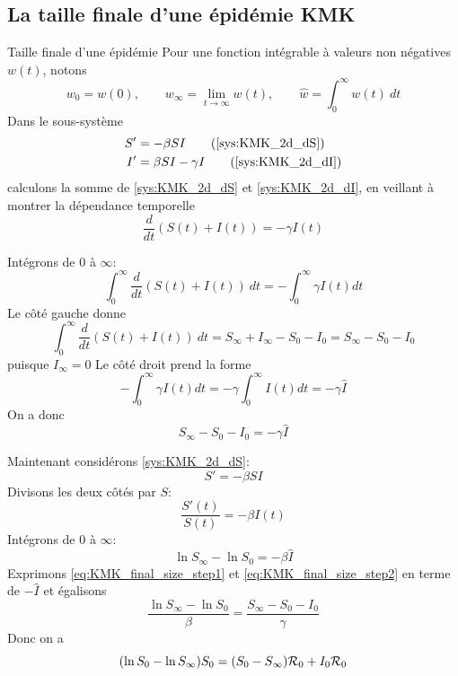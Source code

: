 \documentclass[aspectratio=169]{beamer}\usepackage[]{graphicx}\usepackage[]{xcolor}
\begin{document}
\subsection{La taille finale d'une épidémie KMK}

\begin{frame}{Taille finale d'une épidémie}
  Pour une fonction intégrable à valeurs non négatives $w(t)$, notons
  $$
  w_0=w(0),\qquad  w_\infty = \lim_{t\to\infty}w(t),\qquad\hat w = \int_0^\infty w(t)\ dt
  $$
  \vfill
  Dans le sous-système
  \begin{align}
  S' &= -\beta SI \tag{\ref{sys:KMK_2d_dS}} \\
  I' &= \beta SI-\gamma I \tag{\ref{sys:KMK_2d_dI}} 
  \end{align}
  calculons la somme de \eqref{sys:KMK_2d_dS} et \eqref{sys:KMK_2d_dI}, en veillant à montrer la dépendance temporelle $$
  \frac{d}{dt}(S(t)+I(t))=-\gamma I(t)
  $$
\end{frame}


\begin{frame}{}
  Intégrons de 0 à $\infty$:
  $$
  \int_0^\infty\frac{d}{dt}(S(t)+I(t))\ dt=-\int_0^\infty\gamma I(t)dt 
  $$
  Le côté gauche donne
  $$
  \int_0^\infty\frac{d}{dt}(S(t)+I(t))\ dt
  = S_\infty+I_\infty-S_0-I_0 = S_\infty-S_0-I_0
  $$
  puisque $I_\infty=0$
  \vfill
  Le côté droit prend la forme
  $$
  -\int_0^\infty\gamma I(t)dt = -\gamma\int_0^\infty I(t)dt = -\gamma \hat I
  $$
  On a donc
  \begin{equation}
  \label{eq:KMK_final_size_step1}
  S_\infty-S_0-I_0 = -\gamma\hat I
  \end{equation}
\end{frame}



\begin{frame}{}
  Maintenant considérons \eqref{sys:KMK_2d_dS}:
  $$
  S' = -\beta SI
  $$
  Divisons les deux côtés par $S$:
  $$
  \frac{S'(t)}{S(t)} = -\beta I(t)
  $$
  Intégrons de 0 à $\infty$:
  \begin{equation}
  \label{eq:KMK_final_size_step2}
  \ln S_\infty-\ln S_0 = -\beta \hat I
  \end{equation}
  Exprimons \eqref{eq:KMK_final_size_step1} et \eqref{eq:KMK_final_size_step2} en terme de $-\hat I$ et égalisons
  $$
  \frac{\ln S_\infty-\ln S_0}{\beta}
  =
  \frac{S_\infty-S_0-I_0}{\gamma}
  $$
  Donc on a
  \begin{equation}
  \label{eq:final_size}
  (\ln S_0-\ln S_\infty)S_0 = (S_0-S_\infty)\mathcal{R}_0+I_0\mathcal{R}_0
  \end{equation}
\end{frame}
\end{document}
